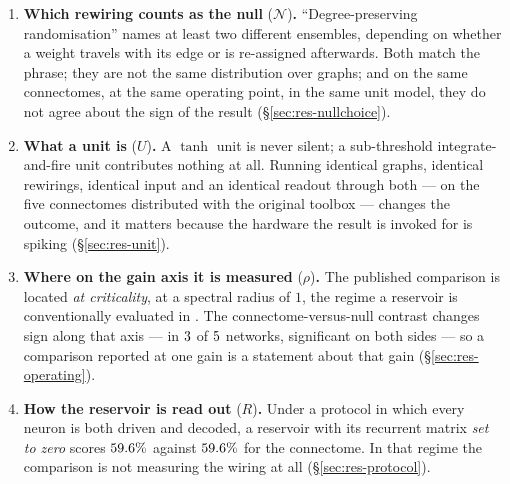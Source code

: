 \begin{enumerate}[leftmargin=1.4em,itemsep=3pt,topsep=4pt]
\item\textbf{Which rewiring counts as the null} ($\mathcal{N}$)\textbf{.} ``Degree-preserving randomisation'' names
at least two different ensembles, depending on whether a weight travels with its edge or
is re-assigned afterwards. Both match the phrase; they are not the same distribution over
graphs; and on the same connectomes, at the same operating point, in the same unit model,
they do not agree about the sign of the result (\S\ref{sec:res-nullchoice}).

\item\textbf{What a unit is} ($U$)\textbf{.} A $\tanh$ unit is never silent; a sub-threshold
integrate-and-fire unit contributes nothing at all. Running identical graphs, identical
rewirings, identical input and an identical readout through both --- on the five
connectomes distributed with the original toolbox --- changes the outcome, and it matters
because the hardware the result is invoked for is spiking (\S\ref{sec:res-unit}).

\item\textbf{Where on the gain axis it is measured} ($\rho$)\textbf{.} The published comparison is located
\emph{at criticality}, at a spectral radius of $1$, the regime a reservoir is
conventionally evaluated in \cite{bertschinger2004real,legenstein2007edge,%
boedecker2012information}. The connectome-versus-null contrast changes sign along that
axis --- in $3$ of $5$ networks, significant on both sides --- so
a comparison reported at one gain is a statement about that gain
(\S\ref{sec:res-operating}).

\item\textbf{How the reservoir is read out} ($R$)\textbf{.} Under a protocol in which every neuron is
both driven and decoded, a reservoir with its recurrent matrix \emph{set to zero} scores
$59.6\%$ against $59.6\%$ for the connectome. In that regime the
comparison is not measuring the wiring at all (\S\ref{sec:res-protocol}).
\end{enumerate}

